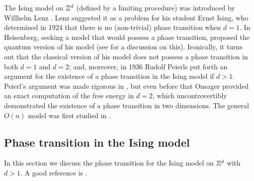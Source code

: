 \begin{rk}
The Ising model on ${ {{\mathbb Z}}^d }$ (defined by a limiting procedure) was introduced
by Willhelm Lenz \cite{Lenz20}. Lenz
suggested it as a problem for his student Ernst Ising, who determined in 1924
\cite{Ising25} that there is no (non-trivial) phase transition when $d = 1$.
In \cite{Heisenberg28} Heisenberg, seeking a model that would possess a phase transition,
proposed the quantum version of his model (see \cite{Brush67} for a discussion on this).
Ironically, it turns out that the classical version of his model does not possess a phase
transition in both $d = 1$ and $d = 2$; and, moreover, in 1936
Rudolf Peierls \cite{Peierls36} put forth an argument for the existence of a phase transition
in the Ising model if $d > 1$. Peierl's argument was made rigorous in \cite{Griffiths64},
but even before that Onsager \cite{Onsager44} provided an exact computation of the
free energy in $d = 2$, which uncontrovertibly demonstrated the existence of a
phase transition in two dimensions.
The general $O(n)$ model was first studied in \cite{Stanley68}.
\end{rk}


\subsection{Phase transition in the Ising model}

In this section we discuss the phase transition for the Ising model on ${ {{\mathbb Z}}^d }$ with $d > 1$.
A good reference is \cite{FV17}.

